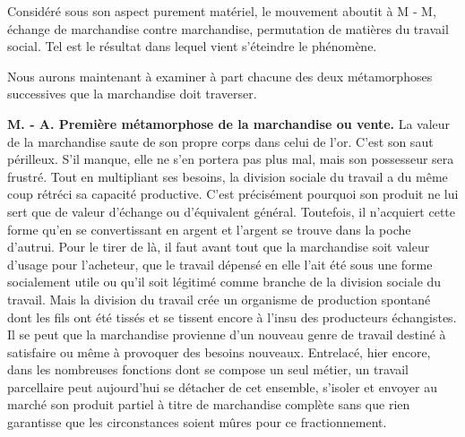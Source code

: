 \documentclass[french,twoside]{book} %
\begin{document}
\noindent Considéré sous son aspect purement matériel, le mouvement aboutit à M ‑ M, échange de marchandise contre marchandise, permutation de matières du travail social. Tel est le résultat dans lequel vient s’éteindre le phénomène.\par
Nous aurons maintenant à examiner à part chacune des deux métamorphoses successives que la marchandise doit traverser.\par
\textbf{M. ‑ A. Première métamorphose de la marchandise ou vente.} La valeur de la marchandise saute de son propre corps dans celui de l’or. C’est son saut périlleux. S’il manque, elle ne s’en portera pas plus mal, mais son possesseur sera frustré. Tout en multipliant ses besoins, la division sociale du travail a du même coup rétréci sa capacité productive. C’est précisément pourquoi son produit ne lui sert que de valeur d’échange ou d’équivalent général. Toutefois, il n’acquiert cette forme qu’en se convertissant en argent et l’argent se trouve dans la poche d’autrui. Pour le tirer de là, il faut avant tout que la marchandise soit valeur d’usage pour l’acheteur, que le travail dépensé en elle l’ait été sous une forme socialement utile ou qu’il soit légitimé comme branche de la division sociale du travail. Mais la division du travail crée un organisme de production spontané dont les fils ont été tissés et se tissent encore à l’insu des producteurs échangistes. Il se peut que la marchandise provienne d’un nouveau genre de travail destiné à satisfaire ou même à provoquer des besoins nouveaux. Entrelacé, hier encore, dans les nombreuses fonctions dont se compose un seul métier, un travail parcellaire peut aujourd’hui se détacher de cet ensemble, s’isoler et envoyer au marché son produit partiel à titre de marchandise complète sans que rien garantisse que les circonstances soient mûres pour ce fractionnement.\par
\end{document}
